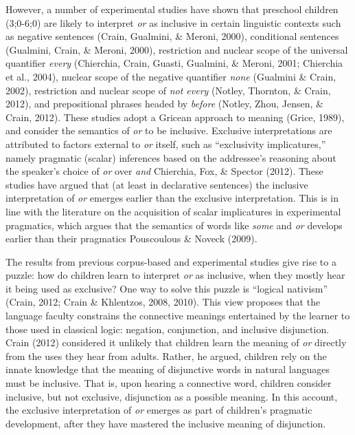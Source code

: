 \documentclass[
  english,
  ,man,floatsintext]{apa6}
\begin{document}
However, a number of experimental studies have shown that preschool children (3;0-6;0) are likely to interpret \emph{or} as inclusive in certain linguistic contexts such as negative sentences (Crain, Gualmini, \& Meroni, 2000), conditional sentences (Gualmini, Crain, \& Meroni, 2000), restriction and nuclear scope of the universal quantifier \emph{every} (Chierchia, Crain, Guasti, Gualmini, \& Meroni, 2001; Chierchia et al., 2004), nuclear scope of the negative quantifier \emph{none} (Gualmini \& Crain, 2002), restriction and nuclear scope of \emph{not every} (Notley, Thornton, \& Crain, 2012), and prepositional phrases headed by \emph{before} (Notley, Zhou, Jensen, \& Crain, 2012). These studies adopt a Gricean approach to meaning (Grice, 1989), and consider the semantics of \emph{or} to be inclusive. Exclusive interpretations are attributed to factors external to \emph{or} itself, such as ``exclusivity implicatures,'' namely pragmatic (scalar) inferences based on the addressee's reasoning about the speaker's choice of \emph{or} over \emph{and} Chierchia, Fox, \& Spector (2012). These studies have argued that (at least in declarative sentences) the inclusive interpretation of \emph{or} emerges earlier than the exclusive interpretation. This is in line with the literature on the acquisition of scalar implicatures in experimental pragmatics, which argues that the semantics of words like \emph{some} and \emph{or} develops earlier than their pragmatics Pouscoulous \& Noveck (2009).

The results from previous corpus-based and experimental studies give rise to a puzzle: how do children learn to interpret \emph{or} as inclusive, when they mostly hear it being used as exclusive? One way to solve this puzzle is ``logical nativism'' (Crain, 2012; Crain \& Khlentzos, 2008, 2010). This view proposes that the language faculty constrains the connective meanings entertained by the learner to those used in classical logic: negation, conjunction, and inclusive disjunction. Crain (2012) considered it unlikely that children learn the meaning of \emph{or} directly from the uses they hear from adults. Rather, he argued, children rely on the innate knowledge that the meaning of disjunctive words in natural languages must be inclusive. That is, upon hearing a connective word, children consider inclusive, but not exclusive, disjunction as a possible meaning. In this account, the exclusive interpretation of \emph{or} emerges as part of children's pragmatic development, after they have mastered the inclusive meaning of disjunction.
\end{document}
